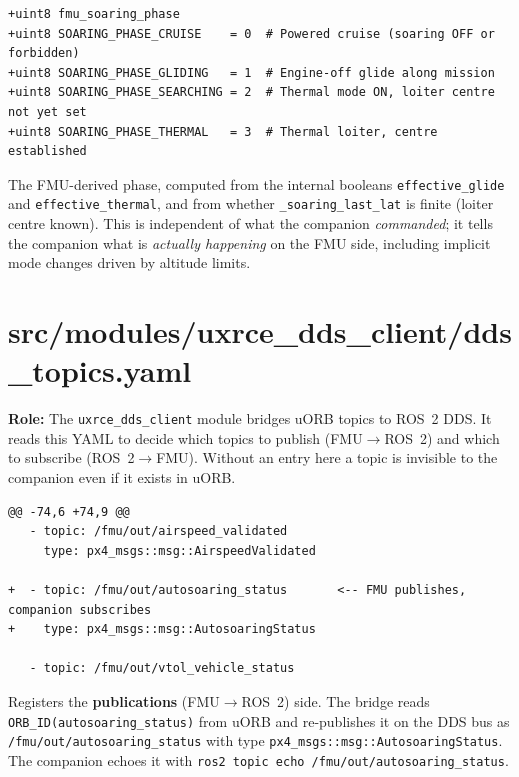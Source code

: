 \documentclass[12pt,a4paper]{article}
\begin{document}
\begin{lstlisting}[style=diff]
+uint8 fmu_soaring_phase
+uint8 SOARING_PHASE_CRUISE    = 0  # Powered cruise (soaring OFF or forbidden)
+uint8 SOARING_PHASE_GLIDING   = 1  # Engine-off glide along mission
+uint8 SOARING_PHASE_SEARCHING = 2  # Thermal mode ON, loiter centre not yet set
+uint8 SOARING_PHASE_THERMAL   = 3  # Thermal loiter, centre established
\end{lstlisting}
\begin{annotation}The FMU-derived phase, computed from the internal booleans \texttt{effective\_glide} and \texttt{effective\_thermal}, and from whether \texttt{\_soaring\_last\_lat} is finite (loiter centre known). This is independent of what the companion \emph{commanded}; it tells the companion what is \emph{actually happening} on the FMU side, including implicit mode changes driven by altitude limits.\end{annotation}

\section{src/modules/uxrce\_dds\_client/dds\_topics.yaml}

\begin{annotation}
\textbf{Role:} The \texttt{uxrce\_dds\_client} module bridges uORB topics to ROS~2 DDS. It reads this YAML to decide which topics to publish (FMU$\to$ROS~2) and which to subscribe (ROS~2$\to$FMU). Without an entry here a topic is invisible to the companion even if it exists in uORB.
\end{annotation}

\begin{lstlisting}[style=diff]
@@ -74,6 +74,9 @@
   - topic: /fmu/out/airspeed_validated
     type: px4_msgs::msg::AirspeedValidated

+  - topic: /fmu/out/autosoaring_status       <-- FMU publishes, companion subscribes
+    type: px4_msgs::msg::AutosoaringStatus

   - topic: /fmu/out/vtol_vehicle_status
\end{lstlisting}
\begin{annotation}Registers the \textbf{publications} (FMU$\to$ROS~2) side. The bridge reads \texttt{ORB\_ID(autosoaring\_status)} from uORB and re-publishes it on the DDS bus as \texttt{/fmu/out/autosoaring\_status} with type \texttt{px4\_msgs::msg::AutosoaringStatus}. The companion echoes it with \texttt{ros2 topic echo /fmu/out/autosoaring\_status}.\end{annotation}
\end{document}

